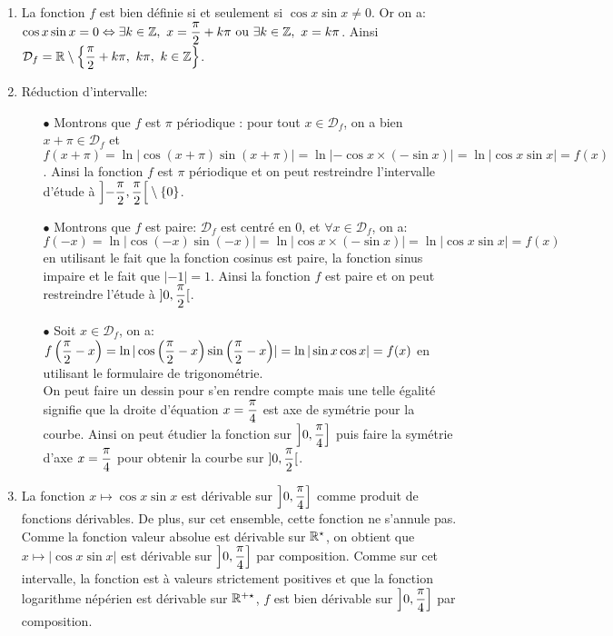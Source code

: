 \documentclass[a4paper, 11pt]{article}
\begin{document}
\begin{correction}  \;
\begin{enumerate}
\item La fonction $f$ est bien d\'efinie si et seulement si $\cos{x}\sin{x}\not= 0$. Or on a: $\cos{x}\sin{x}=0\Leftrightarrow \exists k\in\Z,\ x=\ddp\frac{\pi}{2}+k\pi\ \hbox{ou}\ \exists k\in\Z,\ x=k\pi$. Ainsi $\mathcal{D}_f=\mathbb{R}\setminus\left\lbrace \displaystyle\frac{\pi}{2}+k\pi,\ k\pi,\ k\in\mathbb{Z}\right\rbrace$.
\item R\'eduction d'intervalle:
\begin{itemize}
\item[$\bullet$] Montrons que $f$ est $\pi$ p\'eriodique : pour tout $x\in\mathcal{D}_f$, on a bien $x+\pi\in\mathcal{D}_f$ et $f(x+\pi)=\ln{ |  \cos{(x+\pi)} \sin{(x+\pi)} | }=\ln{| -\cos{x}\times (-\sin{x})| }=\ln{ | \cos{x}\sin{x} | }=f(x)$.
Ainsi la fonction $f$ est $\pi$ p\'eriodique et on peut restreindre l'intervalle d'\'etude \`{a} $\left\rbrack -\displaystyle\frac{\pi}{2},\displaystyle\frac{\pi}{2}\right\lbrack\setminus\lbrace 0\rbrace$.
\item[$\bullet$] Montrons que $f$ est paire: $\mathcal{D}_f$ est centr\'e en 0, et $\forall x\in\mathcal{D}_f$, on a: $f(-x)=\ln{ |  \cos{(-x)}\sin{(-x)} | }=\ln{  |  \cos{x}\times (-\sin{x})  | }=\ln{|  \cos{x} \sin{x}|}=f(x)$ en utilisant le fait que la fonction cosinus est paire, la fonction sinus impaire et le fait que $|-1|=1$.
Ainsi la fonction $f$ est paire et on peut restreindre l'\'etude \`{a} $\rbrack 0,\displaystyle\frac{\pi}{2}\lbrack$. 
\item[$\bullet$] Soit $x\in\mathcal{D}_f$, on a: $f\left(  \displaystyle\frac{\pi}{2}-x \right)=
 \ln{  |  \cos{ \left(  \displaystyle\frac{\pi}{2}-x \right)}  \sin{ \left(  \displaystyle\frac{\pi}{2}-x \right)  }  | } = \ln{ |  \sin{x}\cos{x}   |  }=f(x)  $ en utilisant le formulaire de trigonom\'etrie. \\
\noindent On peut faire un dessin pour s'en rendre compte mais une telle \'egalit\'e signifie que la droite d'\'equation 
$x=\displaystyle\frac{\pi}{4}$ est axe de sym\'etrie pour la courbe. Ainsi on peut \'etudier la fonction sur $\left\rbrack 0,\displaystyle\frac{\pi}{4}\right\rbrack$ puis faire la sym\'etrie d'axe $x=\displaystyle\frac{\pi}{4}$ pour obtenir la courbe sur $\rbrack 0,\displaystyle\frac{\pi}{2}\lbrack$.  
\end{itemize}
\item La fonction $x\mapsto \cos{x}\sin{x}$ est d\'erivable sur $\left\rbrack 0,\displaystyle\frac{\pi}{4}\right\rbrack$ comme produit de fonctions d\'erivables. De plus, sur cet ensemble, cette fonction ne s'annule pas. Comme la fonction valeur absolue est d\'erivable sur $\mathbb{R}^{\star}$, on obtient que $x\mapsto | \cos{x}\sin{x}|$ est d\'erivable sur $\left\rbrack 0,\displaystyle\frac{\pi}{4}\right\rbrack$ par composition. Comme sur cet intervalle, la fonction est \`{a} valeurs strictement positives et que la fonction logarithme n\'ep\'erien est d\'erivable sur $\mathbb{R}^{+\star}$, $f$ est bien d\'erivable sur $\left\rbrack 0,\displaystyle\frac{\pi}{4}\right\rbrack$ par composition.\\

\end{enumerate}
\end{correction}
\end{document}

